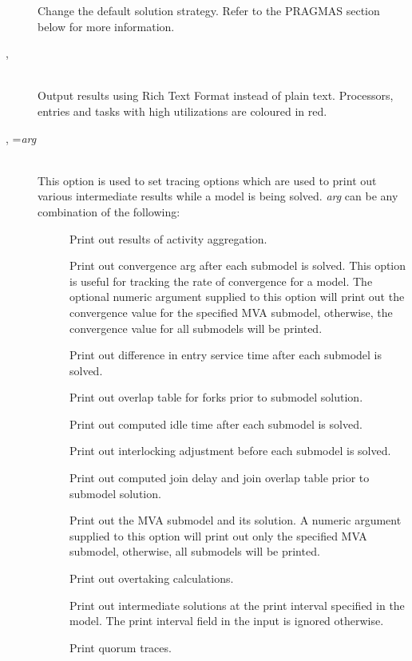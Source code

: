 \begin{description}
Change the default solution strategy.  Refer to the PRAGMAS section
below for more information.
\item[\flag{r}{}, \longopt{rtf}]~\\
Output results using Rich Text Format instead of plain text.  Processors, entries and tasks with high utilizations are coloured in red.
\item[\flag{t}{}, \longopt{trace}=\emph{arg}]~\\
This option is used to set tracing  options which are used to print out various
intermediate results  while a model is being solved.
\emph{arg} can be any combination of the following:
\begin{description}
\item[]
Print out results of activity aggregation.
\item[]
Print out convergence arg after each submodel is solved.  This option is useful for tracking the rate of convergence for a model.
The optional numeric argument supplied to this option will print out the convergence value for the specified MVA submodel, otherwise,
the convergence value for all submodels will be printed.
\item[]
Print out difference in entry service time after each submodel is solved.
\item[]
Print out overlap table for forks prior to submodel solution.
\item[]
Print out computed idle time after each submodel is solved.
\item[]
Print out interlocking adjustment before each submodel is solved.
\item[]
Print out computed join delay and join overlap table prior to submodel solution.
\item[]
Print out the MVA submodel and its solution. A numeric argument supplied to this option will print out only the specified MVA submodel, otherwise, all submodels will be printed.
\item[]
Print out overtaking calculations.
\item[]
Print out intermediate solutions at the print interval specified in the model.  The print interval field in the input is ignored otherwise.
\item[]
Print quorum traces.

\end{description}
\end{description}
